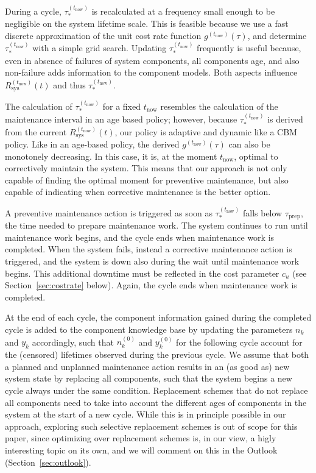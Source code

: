 \documentclass[authoryear]{elsarticle}
\newcommand{\uz}{^{(0)}} %
\def\ykz{y\uz_k}
\def\nkz{n\uz_k}
\def\yknow{y_k^{(\tnow)}}
\def\nknow{n_k^{(\tnow)}}
\newcommand{\nk}{n_k}
\newcommand{\yk}{y_k}
\def\tnow{t_\text{now}}
\def\tpnow{t^+_\text{now}}
\newcommand{\Rsysnow}{R^{(t_\text{now})}_\text{sys}}
\newcommand{\gnow}{g^{(\tnow)}}
\newcommand{\tausnow}{\tau_*^{(\tnow)}}
\newcommand{\tprep}{\tau_{\text{prep}}}
\begin{document}
During a cycle,
$\tausnow$ is recalculated at a frequency small enough to be negligible on the system lifetime scale.
This is feasible because we use a fast discrete approximation of the unit cost rate function $\gnow(\tau)$,
and determine $\tausnow$ with a simple grid search.
Updating $\tausnow$ frequently is useful because,
even in absence of failures of system components,
all components age, and also non-failure adds information to the component models.
Both aspects influence $\Rsysnow(t)$ and thus $\tausnow$.

The calculation of $\tausnow$ for a fixed $\tnow$ resembles the calculation
of the maintenance interval in an age based policy;
however, because $\tausnow$ is derived from the current $\Rsysnow(t)$,
our policy is adaptive and dynamic like a CBM policy. 
Like in an age-based policy, the derived $\gnow(\tau)$ can also be monotonely decreasing.
In this case, it is, at the moment $\tnow$, optimal to correctively maintain the system.
This means that our approach is not only capable of finding the optimal moment for preventive maintenance,
but also capable of indicating when corrective maintenance is the better option.

A preventive maintenance action is triggered as soon as $\tausnow$ falls below $\tprep$,
the time needed to prepare maintenance work.
The system continues to run until maintenance work begins,
and the cycle ends when maintenance work is completed.
When the system fails, instead a corrective maintenance action is triggered,
and the system is down also during the wait until maintenance work begins.
This additional downtime must be reflected in the cost parameter $c_u$ (see Section~\ref{sec:costrate} below).
Again, the cycle ends when maintenance work is completed.

At the end of each cycle,
the component information gained during the completed cycle is added to the component knowledge base
by updating the parameters $\nk$ and $\yk$ accordingly,
such that $\nkz$ and $\ykz$ for the following cycle account for the (censored) lifetimes observed during the previous cycle.
We assume that both a planned and unplanned maintenance action results in an (as good as) new system state by replacing all components,
such that the system begins a new cycle always under the same condition.
Replacement schemes that do not replace all components need to take into account the different ages of components in the system
at the start of a new cycle.
While this is in principle possible in our approach,
exploring such selective replacement schemes is out of scope for this paper,
since optimizing over replacement schemes is, in our view, a higly interesting topic on its own,
and we will comment on this in the Outlook (Section~\ref{sec:outlook}).
\end{document}
